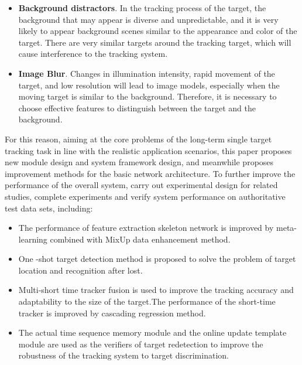 \documentclass[promaster]{thesis-uestc}
\begin{document}
\begin{englishabstract}
\begin{itemize}
    \item \textbf{Background distractors}. In the tracking process of the target, the background that may appear is diverse and unpredictable, and it is very likely to appear background scenes similar to the appearance and color of the target. There are very similar targets around the tracking target, which will cause interference to the tracking system.
    \item \textbf{Image Blur}. Changes in illumination intensity, rapid movement of the target, and low resolution will lead to image models, especially when the moving target is similar to the background. Therefore, it is necessary to choose effective features to distinguish between the target and the background.
\end{itemize}

For this reason, aiming at the core problems of the long-term single target tracking task in line with the realistic application scenarios, this paper proposes new module design and system framework design, and meanwhile proposes improvement methods for the basic network architecture.
To further improve the performance of the overall system, carry out experimental design for related studies, complete experiments and verify system performance on authoritative test data sets, including:
\begin{itemize}
    \item The performance of feature extraction skeleton network is improved by meta-learning combined with MixUp data enhancement method.
    \item One -shot target detection method is proposed to solve the problem of target location and recognition after lost.
    \item Multi-short time tracker fusion is used to improve the tracking accuracy and adaptability to the size of the target.The performance of the short-time tracker is improved by cascading regression method.
    \item The actual time sequence memory module and the online update template module are used as the verifiers of target redetection to improve the robustness of the tracking system to target discrimination.
\end{itemize}


\end{englishabstract}
\end{document}
